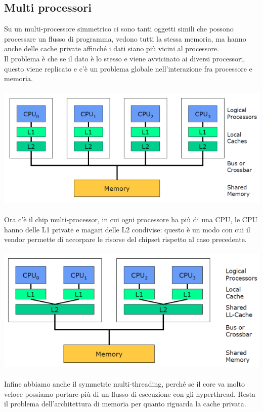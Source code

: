 \documentclass[14pt, oneside]{book}
\begin{document}
\subsection{Multi processori}
Su un multi-processore simmetrico ci sono tanti oggetti simili che possono processare un flusso di programma, vedono tutti la stessa memoria, ma hanno anche delle cache private affinché i dati siano più vicini al processore.\\ Il problema è che se il dato è lo stesso e viene avvicinato ai diversi processori, questo viene replicato e c'è un problema globale nell'interazione fra processore e memoria.\\\\
\includegraphics[scale=0.5]{immagini/multi_proc}\\\\
Ora c'è il chip multi-processor, in cui ogni processore ha più di una CPU, le CPU hanno delle L1 private e magari delle L2 condivise: questo è un modo con cui il vendor permette di accorpare le risorse del chipset rispetto al caso precedente.\\\\
\includegraphics[scale=0.5]{immagini/cmp.png} \\\\
Infine abbiamo anche il symmetric multi-threading, perché se il core va molto veloce possiamo portare più di un flusso di esecuzione con gli hyperthread. Resta il problema dell'architettura di memoria per quanto riguarda la cache privata.\\\\ 
\end{document}
